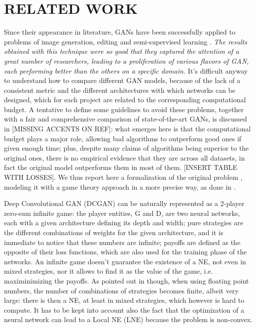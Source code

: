 \section{RELATED WORK} \label{relatedwork}

Since their appearance in literature, GANs have been successfully applied to problems of image generation, editing and semi-supervised learning \cite{DBLP:journals/corr/RadfordMC15} \cite{DBLP:journals/corr/ZhangXLZHWM16}. \textit{The results obtained with this technique were so good that they captured the attention of a great number of researchers, leading to a proliferation of various flavors of GAN, each performing better than the others on a specific domain.} It's difficult anyway to understand how to compare different GAN models, because of the lack of a consistent metric and the different architectures with which networks can be designed, which for each project are related to the corresponding computational budget. A tentative to define some guidelines to avoid these problems, together with a fair and comprehensive comparison of state-of-the-art GANs, is discussed in \cite{46506}[MISSING ACCENTS ON REF]: what emerges here is that the computational budget plays a major role, allowing bad algorithms to outperform good ones if given enough time; plus, despite many claims of algorithms being superior to the original ones, there is no empirical evidence that they are across all datasets, in fact the original model outperforms them in most of them. [INSERT TABLE WITH LOSSES].
We thus report here a formalization of the original problem \cite{NIPS2014_5423}, modeling it with a game theory approach in a more precise way, as done in \cite{2017arXiv171200679O}.

Deep Convolutional GAN (DCGAN) can be naturally represented as a 2-player zero-sum infinite game: the player entities, G and D, are two neural networks, each with a given architecture defining its depth and width; pure strategies are the different combinations of weights for the given architecture, and it is immediate to notice that these numbers are infinite; payoffs are defined as the opposite of their loss functions, which are also used for the training phase of the networks.
An infinite game doesn't guarantee the existence of a NE, not even in mixed strategies, nor it allows to find it as the value of the game, i.e. maximinimizing the payoffs. As pointed out in  \cite{2017arXiv171200679O} though, when using floating point numbers, the number of combinations of strategies becomes finite, albeit very large: there is then a NE, at least in mixed strategies, which however is hard to compute. It has to be kept into account also the fact that the optimization of a neural network can lead to a Local NE (LNE) because the problem is non-convex.

